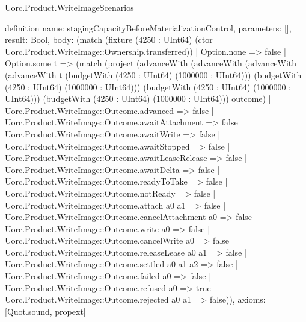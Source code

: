 \begin{lexlean}{Uorc.Product.WriteImageScenarios}
\begin{semanticmodule}
definition{
  name: stagingCapacityBeforeMaterializationControl,
  parameters: [],
  result: Bool,
  body: (match (fixture (4250 : UInt64) (ctor Uorc.Product.WriteImage::Ownership.transferred))
    | Option.none => false
    | Option.some t => (match (project (advanceWith (advanceWith (advanceWith (advanceWith t (budgetWith (4250 : UInt64) (1000000 : UInt64))) (budgetWith (4250 : UInt64) (1000000 : UInt64))) (budgetWith (4250 : UInt64) (1000000 : UInt64))) (budgetWith (4250 : UInt64) (1000000 : UInt64))) outcome)
      | Uorc.Product.WriteImage::Outcome.advanced => false
      | Uorc.Product.WriteImage::Outcome.awaitAttachment => false
      | Uorc.Product.WriteImage::Outcome.awaitWrite => false
      | Uorc.Product.WriteImage::Outcome.awaitStopped => false
      | Uorc.Product.WriteImage::Outcome.awaitLeaseRelease => false
      | Uorc.Product.WriteImage::Outcome.awaitDelta => false
      | Uorc.Product.WriteImage::Outcome.readyToTake => false
      | Uorc.Product.WriteImage::Outcome.notReady => false
      | Uorc.Product.WriteImage::Outcome.attach a0 a1 => false
      | Uorc.Product.WriteImage::Outcome.cancelAttachment a0 => false
      | Uorc.Product.WriteImage::Outcome.write a0 => false
      | Uorc.Product.WriteImage::Outcome.cancelWrite a0 => false
      | Uorc.Product.WriteImage::Outcome.releaseLease a0 a1 => false
      | Uorc.Product.WriteImage::Outcome.settled a0 a1 a2 => false
      | Uorc.Product.WriteImage::Outcome.failed a0 => false
      | Uorc.Product.WriteImage::Outcome.refused a0 => true
      | Uorc.Product.WriteImage::Outcome.rejected a0 a1 => false)),
  axioms: [Quot.sound, propext]
}


\end{semanticmodule}
\end{lexlean}
